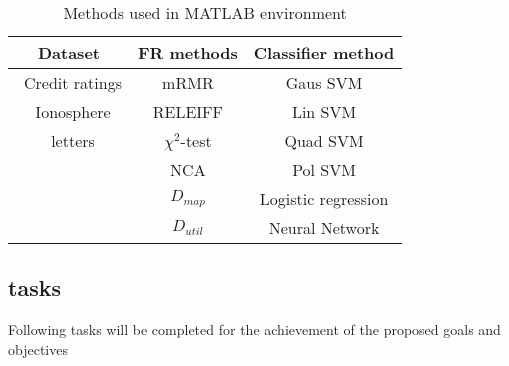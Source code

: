 \begin{table}
\centering
\caption{Methods used in MATLAB environment}\label{tab: methods}
\noindent\begin{tabular}{*{3}{c}}
\toprule
Dataset        & FR methods                        & Classifier method  \\ 
\midrule\
Credit ratings & mRMR                              & Gaus SVM               \\ 
\midrule\
Ionosphere              & RELEIFF                           & Lin SVM            \\ 
\midrule\
letters              & $\chi^2$-test                     & Quad SVM           \\ 
\midrule\
               & NCA                               & Pol SVM                   \\
\midrule\
               &    $D_{map}$                          & Logistic regression \\
\midrule\
               &    $D_{util}$                        & Neural Network\\
\bottomrule
\end{tabular}
\end{table}

\subsection{tasks}
Following tasks will be completed for the achievement of the proposed goals and objectives


